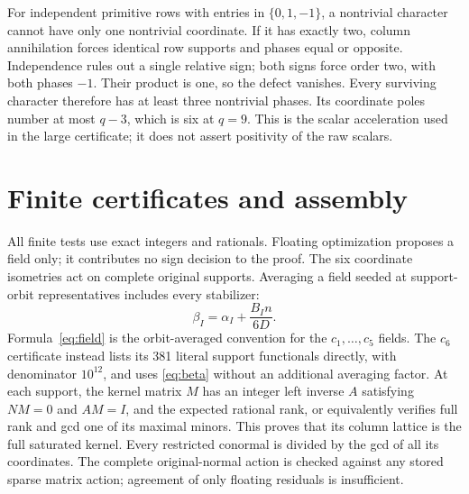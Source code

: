 \documentclass[11pt]{article}
\theoremstyle{definition}\newtheorem{definition}[theorem]{Definition}
\theoremstyle{remark}\newtheorem{remark}[theorem]{Remark}
\begin{document}
For independent primitive rows with entries in \(\{0,1,-1\}\), a
nontrivial character cannot have only one nontrivial coordinate. If it
has exactly two, column annihilation forces identical row supports and
phases equal or opposite. Independence rules out a single relative sign;
both signs force order two, with both phases \(-1\). Their product is
one, so the defect vanishes. Every surviving character therefore has at
least three nontrivial phases. Its coordinate poles number at most \(q-3\),
which is six at \(q=9\). This is the scalar acceleration used in the
large certificate; it does not assert positivity of the raw scalars.

\section{Finite certificates and assembly}\label{sec:finite}
All finite tests use exact integers and rationals. Floating optimization
proposes a field only; it contributes no sign decision to the proof.
The six coordinate isometries act on complete original supports. Averaging
a field seeded at support-orbit representatives includes every stabilizer:
\begin{equation}\label{eq:field}
 \beta_I=\alpha_I+\frac{B_I n}{6D}.
\end{equation}
Formula~\eqref{eq:field} is the orbit-averaged convention for the
\(c_1,\ldots,c_5\) fields. The \(c_6\) certificate instead lists its
381 literal support functionals directly, with denominator \(10^{12}\),
and uses \eqref{eq:beta} without an additional averaging factor.
At each support, the kernel matrix \(M\) has an integer left inverse
\(A\) satisfying \(NM=0\) and \(AM=I\), and the expected rational
rank, or equivalently verifies full rank and gcd one of its maximal minors.
This proves that its column lattice is the full saturated kernel.
Every restricted conormal is divided by the gcd of all its coordinates.
The complete original-normal action is checked against any stored sparse
matrix action; agreement of only floating residuals is insufficient.
\end{document}

